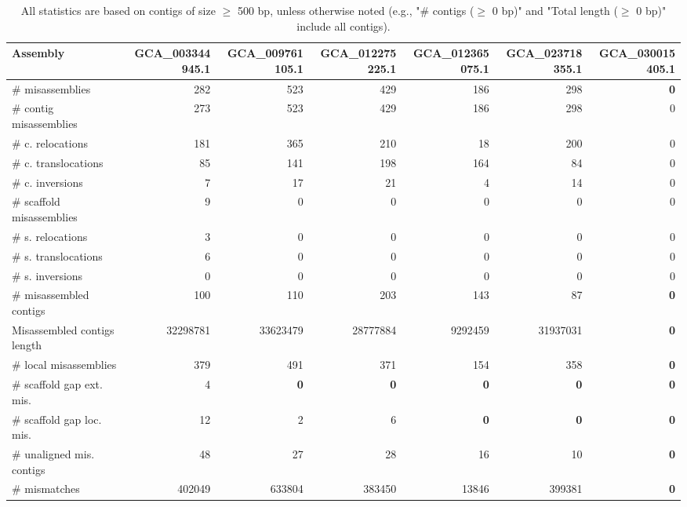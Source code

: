 \documentclass[12pt,a4paper]{article}
\begin{document}
\begin{table}[ht]
\begin{center}
\caption{All statistics are based on contigs of size $\geq$ 500 bp, unless otherwise noted (e.g., "\# contigs ($\geq$ 0 bp)" and "Total length ($\geq$ 0 bp)" include all contigs).}
\begin{tabular}{|l*{6}{|r}|}
\hline
Assembly & GCA\_003344945.1 & GCA\_009761105.1 & GCA\_012275225.1 & GCA\_012365075.1 & GCA\_023718355.1 & GCA\_030015405.1 \\ \hline
\# misassemblies & 282 & 523 & 429 & 186 & 298 & {\bf 0} \\ \hline
\hspace{2mm}\# contig misassemblies & 273 & 523 & 429 & 186 & 298 & 0 \\ \hline
\hspace{5mm}\# c. relocations & 181 & 365 & 210 & 18 & 200 & 0 \\ \hline
\hspace{5mm}\# c. translocations & 85 & 141 & 198 & 164 & 84 & 0 \\ \hline
\hspace{5mm}\# c. inversions & 7 & 17 & 21 & 4 & 14 & 0 \\ \hline
\hspace{2mm}\# scaffold misassemblies & 9 & 0 & 0 & 0 & 0 & 0 \\ \hline
\hspace{5mm}\# s. relocations & 3 & 0 & 0 & 0 & 0 & 0 \\ \hline
\hspace{5mm}\# s. translocations & 6 & 0 & 0 & 0 & 0 & 0 \\ \hline
\hspace{5mm}\# s. inversions & 0 & 0 & 0 & 0 & 0 & 0 \\ \hline
\# misassembled contigs & 100 & 110 & 203 & 143 & 87 & {\bf 0} \\ \hline
Misassembled contigs length & 32298781 & 33623479 & 28777884 & 9292459 & 31937031 & {\bf 0} \\ \hline
\# local misassemblies & 379 & 491 & 371 & 154 & 358 & {\bf 0} \\ \hline
\# scaffold gap ext. mis. & 4 & {\bf 0} & {\bf 0} & {\bf 0} & {\bf 0} & {\bf 0} \\ \hline
\# scaffold gap loc. mis. & 12 & 2 & 6 & {\bf 0} & {\bf 0} & {\bf 0} \\ \hline
\# unaligned mis. contigs & 48 & 27 & 28 & 16 & 10 & {\bf 0} \\ \hline
\# mismatches & 402049 & 633804 & 383450 & 13846 & 399381 & {\bf 0} \\ \hline

\end{tabular}
\end{center}
\end{table}
\end{document}
